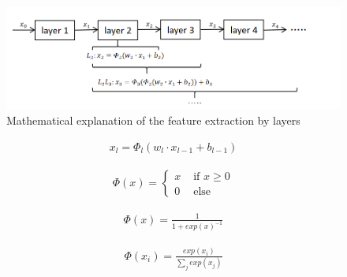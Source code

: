   \begin{figure}
    \centering
    \includegraphics[width=0.9\linewidth]{example_images/mathLayers}
    \caption{Mathematical explanation of the feature extraction by layers}
    \label{Mathematical explanation of the feature extraction by layers}
  \end{figure}
  \begin{align}
    x_{l}=\Phi _{l}(w_{l} \cdot x_{l-1}+ b_{l-1})
     \label{eq:layer}
  \end{align}

  \begin{align}
    \Phi(x) = \begin{cases}
      x& \text{ if } x\ge 0 \\
      0& \text{ else } 
    \end{cases}
     \label{eq:ReLU}
  \end{align}

  \begin{align}
    \Phi(x) = \frac{1}{1+exp(x)^{-1}}  
     \label{eq:Sigmoid}
  \end{align}

  \begin{align}
    \Phi(x_{i}) = \frac{exp(x_{i})}{\sum_{j}exp(x_{j}) } 
     \label{eq:softmax}
  \end{align}
